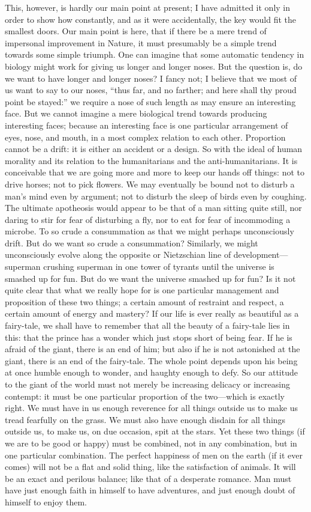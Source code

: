This, however, is hardly our main point at present; I have admitted it only in order to show how constantly, and as it were accidentally, the key would fit the smallest doors. Our main point is here, that if there be a mere trend of impersonal improvement in Nature, it must presumably be a simple trend towards some simple triumph. One can imagine that some automatic tendency in biology might work for giving us longer and longer noses. But the question is, do we want to have longer and longer noses? I fancy not; I believe that we most of us want to say to our noses, “thus far, and no farther; and here shall thy proud point be stayed:” we require a nose of such length as may ensure an interesting face. But we cannot imagine a mere biological trend towards producing interesting faces; because an interesting face is one particular arrangement of eyes, nose, and mouth, in a most complex relation to each other. Proportion cannot be a drift: it is either an accident or a design. So with the ideal of human morality and its relation to the humanitarians and the anti-humanitarians. It is conceivable that we are going more and more to keep our hands off things: not to drive horses; not to pick flowers. We may eventually be bound not to disturb a man’s mind even by argument; not to disturb the sleep of birds even by coughing. The ultimate apotheosis would appear to be that of a man sitting quite still, nor daring to stir for fear of disturbing a fly, nor to eat for fear of incommoding a microbe. To so crude a consummation as that we might perhaps unconsciously drift. But do we want so crude a consummation? Similarly, we might unconsciously evolve along the opposite or Nietzschian line of development—superman crushing superman in one tower of tyrants until the universe is smashed up for fun. But do we want the universe smashed up for fun? Is it not quite clear that what we really hope for is one particular management and proposition of these two things; a certain amount of restraint and respect, a certain amount of energy and mastery? If our life is ever really as beautiful as a fairy-tale, we shall have to remember that all the beauty of a fairy-tale lies in this: that the prince has a wonder which just stops short of being fear. If he is afraid of the giant, there is an end of him; but also if he is not astonished at the giant, there is an end of the fairy-tale. The whole point depends upon his being at once humble enough to wonder, and haughty enough to defy. So our attitude to the giant of the world must not merely be increasing delicacy or increasing contempt: it must be one particular proportion of the two—which is exactly right. We must have in us enough reverence for all things outside us to make us tread fearfully on the grass. We must also have enough disdain for all things outside us, to make us, on due occasion, spit at the stars. Yet these two things (if we are to be good or happy) must be combined, not in any combination, but in one particular combination. The perfect happiness of men on the earth (if it ever comes) will not be a flat and solid thing, like the satisfaction of animals. It will be an exact and perilous balance; like that of a desperate romance. Man must have just enough faith in himself to have adventures, and just enough doubt of himself to enjoy them.

